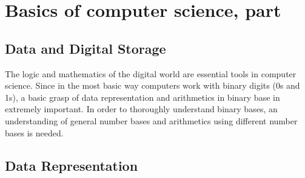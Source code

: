 \section{Basics of computer science, part }
\subsection*{Data and Digital Storage}
The logic and mathematics of the digital world are essential tools in computer science. Since in the most basic way computers work with binary digits (0s and 1s), a basic grasp of data representation and arithmetics in binary base in extremely important. In order to thoroughly understand binary bases, an understanding of general number bases and arithmetics using different number bases is needed.

\subsection{Data Representation}
